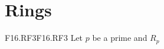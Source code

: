 \documentclass[../AlgebraQualSolutions.tex]{subfiles}
\begin{document}
\section{Rings}

\begin{prob}{F16.RF3}{F16.RF3}
    Let $p$ be a prime and $R_p$ 
\end{prob}
\end{document}
